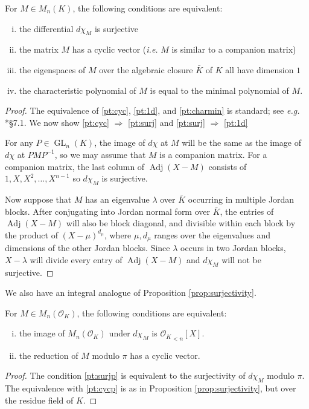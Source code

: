 \documentclass{sig-alternate-05-2015}
\DeclareMathOperator{\GL}{GL}
\DeclareMathOperator{\adj}{Adj}
\newcommand{\OK}{\mathcal{O}_K}
\begin{document}
\begin{prop}
\label{prop:surjectivity}
For $M \in M_n(K)$, the following conditions are equivalent:
\begin{enumerate}[(i)]
\renewcommand{\itemsep}{0pt}
\item \label{pt:surj} the differential $d\chi_M$ is surjective
\item \label{pt:cyc} the matrix $M$ has a cyclic vector (\emph{i.e.} $M$ is similar
to a companion matrix)
\item \label{pt:1d} the eigenspaces of $M$ over the algebraic
closure $\bar{K}$ of $K$ all have dimension $1$
\item \label{pt:charmin} the characteristic polynomial of $M$ is equal to the minimal polynomial of $M$.
\end{enumerate}
\end{prop}

\begin{proof}
The equivalence of \eqref{pt:cyc}, \eqref{pt:1d}, and \eqref{pt:charmin} is standard; see \emph{e.g.}
\cite{hoffman-kunze:LinearAlgebra}*{\S 7.1}.  We now show
\eqref{pt:cyc} $\Rightarrow$ \eqref{pt:surj} and \eqref{pt:surj} $\Rightarrow$ \eqref{pt:1d}

For any $P \in \GL_n(K)$, the image of $d\chi$ at $M$ will be the same
as the image of $d\chi$ at $PMP^{-1}$, so we may assume that
$M$ is a companion matrix.  For a companion matrix, the last column of
$\adj(X-M)$ consists of $1, X, X^2, \dots, X^{n-1}$ so $d\chi_M$ is surjective.

Now suppose that $M$ has an eigenvalue $\lambda$ over $\bar{K}$ occurring in multiple Jordan blocks.
After conjugating into Jordan normal form over $\bar{K}$, the entries of $\adj(X-M)$
will also be block diagonal, and divisible within each block by the product of $(X-\mu)^{d_\mu}$,
where $\mu, d_\mu$ ranges over the eigenvalues and dimensions of the other Jordan blocks.
Since $\lambda$ occurs in two Jordan blocks,
$X - \lambda$ will divide every entry of $\adj(X-M)$ and $d\chi_M$ will not be surjective.
\end{proof}

We also have an integral analogue of Proposition \ref{prop:surjectivity}.

\begin{prop}
\label{prop:intsurj}
For $M \in M_n(\OK)$, the following conditions are equivalent:
\begin{enumerate}[(i)]
\renewcommand{\itemsep}{0pt}
\item \label{pt:surjp} the image of $M_n(\OK)$ under $d\chi_M$ is 
${\OK}_{<n}[X]$.
\item \label{pt:cycp} the reduction of $M$ modulo $\pi$ has a cyclic vector.
\end{enumerate}
\end{prop}
\begin{proof}
The condition \eqref{pt:surjp} is equivalent to the surjectivity of $d\chi_M$ modulo $\pi$.  The equivalence with
\eqref{pt:cycp} is as in Proposition \ref{prop:surjectivity}, but over the residue field of $K$.
\end{proof}
\end{document}
